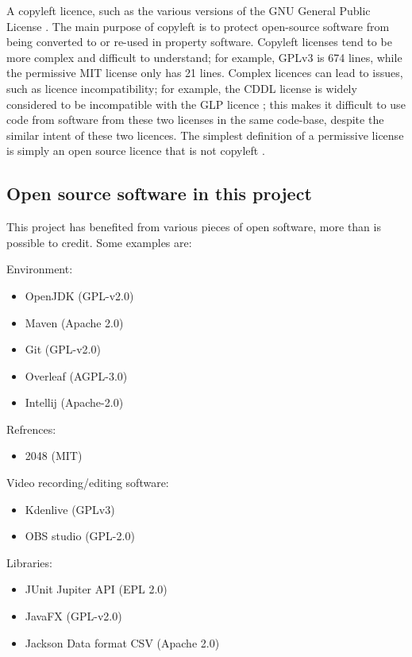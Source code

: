 \documentclass{article}
\begin{document}
A copyleft licence, such as the various versions of the GNU General Public License \cite{gnu_copyleft}. The main purpose of copyleft is to protect open-source software from being converted to or re-used in property software. Copyleft licenses tend to be more complex and difficult to understand; for example, GPLv3 is 674 lines, while the permissive MIT license only has 21 lines. Complex licences can lead to issues, such as licence incompatibility; for example, the CDDL license is widely considered to be incompatible with the GLP licence \cite{gnu_cddl}; this makes it difficult to use code from software from these two licenses in the same code-base, despite the similar intent of these two licences. The simplest definition of a permissive license is simply an open source licence that is not copyleft \cite{osi_faq}.

\subsection{Open source software in this project}
\label{subsubsec:ossinthis}
This project has benefited from various pieces of open software, more than is possible to credit. Some examples are:
\begin{multicols}{2}
\begin{samepage}
Environment:
\begin{itemize}
    \item OpenJDK (GPL-v2.0)
    \item Maven (Apache 2.0)
    \item Git (GPL-v2.0)
    \item Overleaf (AGPL-3.0)
    \item Intellij (Apache-2.0)
\end{itemize}
\end{samepage}
Refrences:
\begin{itemize}
    \item 2048 (MIT)
\end{itemize}
\columnbreak
\begin{samepage}
Video recording/editing software:
\begin{itemize}
    \item Kdenlive (GPLv3)
    \item OBS studio (GPL-2.0)
\end{itemize}
\end{samepage}
\begin{samepage}
Libraries:
\begin{itemize}
    \item JUnit Jupiter API (EPL 2.0)
    \item JavaFX (GPL-v2.0)
    \item Jackson Data format CSV (Apache 2.0)
\end{itemize}
\end{samepage}
\end{multicols}
\end{document}
